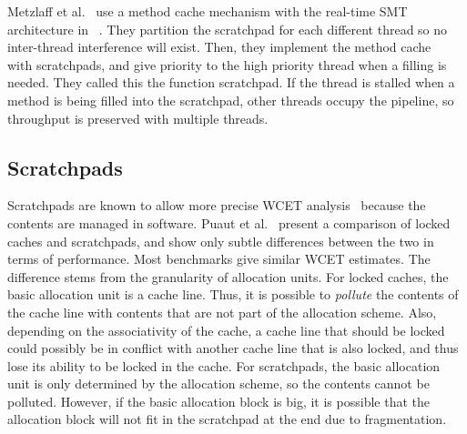 Metzlaff et al.~\cite{Metzlaff2008MethodcacheSMIT} use a method cache mechanism with the real-time SMT architecture in ~\cite{Mische2008SMT}.
They partition the scratchpad for each different thread so no inter-thread interference will exist.   
Then, they implement the method cache~\cite{Kirner2007ModelFunctionCache} with scratchpads, and give priority to the high priority thread when a filling is needed.
They called this the function scratchpad.  
If the thread is stalled when a method is being filled into the scratchpad, other threads occupy the pipeline, so throughput is preserved with multiple threads. 

\subsection{Scratchpads}
Scratchpads are known to allow more precise WCET analysis~\cite{Wehmeyer2005SPM} because the contents are managed in software. 
Puaut et al.~\cite{Puaut2007SPMvsCache} present a comparison of locked caches and scratchpads, and show only subtle differences between the two in terms of performance. 
Most benchmarks give similar WCET estimates. 
The difference stems from the granularity of allocation units. 
For locked caches, the basic allocation unit is a cache line. 
Thus, it is possible to \emph{pollute} the contents of the cache line with contents that are not part of the allocation scheme. 
Also, depending on the associativity of the cache, a cache line that should be locked could possibly be in conflict with another cache line that is also locked, and thus lose its ability to be locked in the cache. 
For scratchpads, the basic allocation unit is only determined by the allocation scheme, so the contents cannot be polluted. 
However, if the basic allocation block is big, it is possible that the allocation block will not fit in the scratchpad at the end due to fragmentation.  
 
% 
% 


